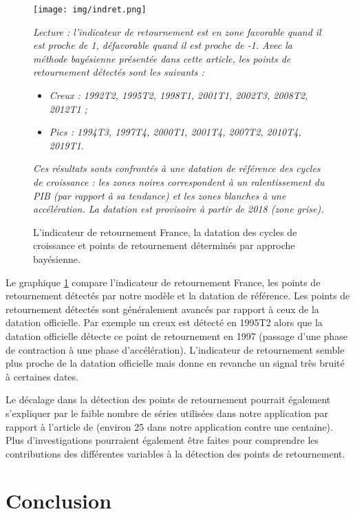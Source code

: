 \documentclass[10pt,french,french]{article}
\begin{document}
\begin{figure}[h]
{\centering
\texttt{[image: img/indret.png]}
\caption{L’indicateur de retournement France, la datation des cycles de croissance et points de retournement déterminés par approche bayésienne.}\label{fig:indret}}
\footnotesize
\emph{Lecture : l’indicateur de retournement est en zone favorable quand il est proche de 1, défavorable quand il est proche de -1.
Avec la méthode bayésienne présentée dans cette article, les points de retournement détectés sont les suivants :}
\begin{itemize}
\item \emph{Creux : 1992T2, 1995T2, 1998T1, 2001T1, 2002T3, 2008T2, 2012T1 ;}
\item \emph{Pics : 1994T3, 1997T4, 2000T1, 2001T4, 2007T2, 2010T4, 2019T1.}
\end{itemize}
\emph{Ces résultats sonts confrontés à une datation de référence des cycles de croissance : les zones noires correspondent à un ralentissement du PIB (par rapport à sa tendance) et les zones blanches à une accélération. La datation est provisoire à partir de 2018 (zone grise).}
\end{figure}

Le graphique \ref{fig:indret} compare l'indicateur de retournement France, les points de retournement détectés par notre modèle et la datation de référence.
Les points de retournement détectés sont généralement avancés par rapport à ceux de la datation officielle.
Par exemple un creux est détecté en 1995T2 alors que la datation officielle détecte ce point de retournement en 1997 (passage d'une phase de contraction à une phase d'accélération).
L'indicateur de retournement semble plus proche de la datation officielle mais donne en revanche un signal très bruité à certaines dates.

Le décalage dans la détection des points de retournement pourrait également s'expliquer par le faible nombre de séries utilisées dans notre application par rapport à l'article de \cite{Kaufmann} (environ 25 dans notre application contre une centaine).
Plus d'investigations pourraient également être faites pour comprendre les contributions des différentes variables à la détection des points de retournement.

\hypertarget{conclusion}{%
\section{Conclusion}\label{conclusion}}
\end{document}
